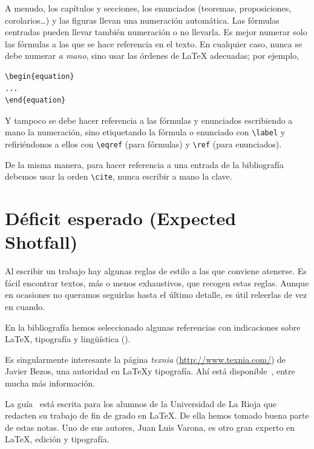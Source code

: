 \documentclass[11pt]{book}
\theoremstyle{plain} %
\theoremstyle{definition} %
\begin{document}
A menudo, los capítulos y secciones, los enunciados (teoremas, proposiciones, 
corolarios\dots) y las figuras llevan una numeración 
automática. Las fórmulas centradas pueden llevar 
también numeración o no llevarla. Es mejor numerar solo las fórmulas a las que se 
hace referencia en el texto. En cualquier caso, nunca se debe numerar \emph{a 
mano}, sino usar las órdenes de {\LaTeX} adecuadas; por ejemplo,
\begin{verbatim}
\begin{equation}
...
\end{equation}
\end{verbatim}
Y tampoco se debe hacer referencia a las fórmulas y enunciados escribiendo a mano 
la numeración, sino etiquetando la fórmula o enunciado con \verb"\label"  y 
refiriéndonos a ellos con \verb"\eqref" (para fórmulas) y \verb"\ref" (para 
enunciados).

De la misma manera, para hacer referencia a una entrada de la bibliografía 
debemos usar la orden \verb"\cite", nunca escribir a mano la clave.

\section{Déficit esperado (Expected Shotfall)}

Al escribir un trabajo hay algunas reglas de estilo a las que conviene atenerse. 
Es fácil encontrar textos, más o menos exhaustivos, que recogen estas reglas. 
Aunque en ocasiones no queramos seguirlas hasta el último detalle, es útil 
releerlas de vez en cuando.

En la bibliografía hemos seleccionado algunas referencias con indicaciones sobre 
{\LaTeX}, tipografía y lingüística (\cite{ALV,B,RAE}).

Es singularmente interesante la página \emph{texnia}
(\url{http://www.texnia.com/}) de Javier Bezos, una autoridad en \LaTeX y tipografía. Ahí está 
disponible~\cite{B}, entre mucha más información.

La guía~\cite{ALV} está escrita para los alumnos de la Universidad de La Rioja que redacten su 
trabajo de fin de grado en \LaTeX. De ella hemos tomado buena parte de estas notas. Uno de sus 
autores, Juan Luis Varona, es otro gran experto en {\LaTeX}, edición y tipografía.

\end{document}

